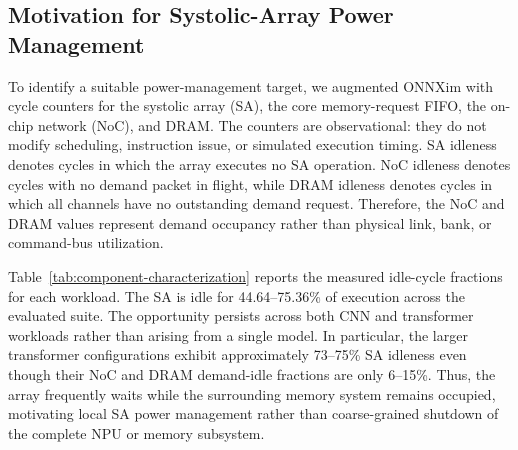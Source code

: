 \subsection{Motivation for Systolic-Array Power Management}
\label{sec:component-selection}

To identify a suitable power-management target, we augmented ONNXim with
cycle counters for the systolic array (SA), the core memory-request FIFO, the
on-chip network (NoC), and DRAM. The counters are observational: they do not
modify scheduling, instruction issue, or simulated execution timing. SA
idleness denotes cycles in which the array executes no SA operation. NoC
idleness denotes cycles with no demand packet in flight, while DRAM idleness
denotes cycles in which all channels have no outstanding demand request.
Therefore, the NoC and DRAM values represent demand occupancy rather than
physical link, bank, or command-bus utilization.

Table~\ref{tab:component-characterization} reports the measured idle-cycle
fractions for each workload. The SA is idle for 44.64--75.36\% of execution
across the evaluated suite. The opportunity persists across both CNN and
transformer workloads rather than arising from a single model. In particular,
the larger transformer configurations exhibit approximately 73--75\% SA
idleness even though their NoC and DRAM demand-idle fractions are only
6--15\%. Thus, the array frequently waits while the surrounding memory system
remains occupied, motivating local SA power management rather than
coarse-grained shutdown of the complete NPU or memory subsystem.

